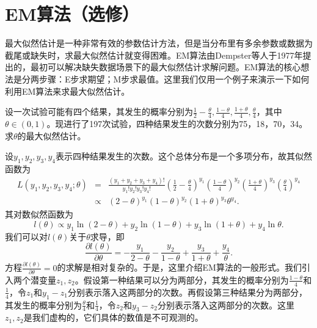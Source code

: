 \section{EM算法（选修）}
最大似然估计是一种非常有效的参数估计方法，但是当分布里有多余参数或数据为截尾或缺失时，求最大似然估计就变得困难。EM算法由Dempster等人于1977年提出的，最初可以解决缺失数据场景下的最大似然估计求解问题。EM算法的核心想法是分两步骤：E步求期望；M步求最值。这里我们仅用一个例子来演示一下如何利用EM算法来求最大似然估计。
\begin{example}
    设一次试验可能有四个结果，其发生的概率分别为$\frac{1}{2}-\frac{\theta}{4}, \frac{1-\theta}{4},\frac{1+\theta}{4},\frac{\theta}{4}$，其中$\theta \in (0,1)$。现进行了197次试验，四种结果发生的次数分别为75，18，70，34。求$\theta$的最大似然估计。
\end{example}
\begin{solution}
设$y_1,y_2,y_3,y_4$表示四种结果发生的次数。这个总体分布是一个多项分布，故其似然函数为
\begin{eqnarray*}
L(y_1,y_2,y_3,y_4;\theta) &=& \frac{(y_1+y_2+y_3+y_4)!}{y_1!y_2!y_3!y_4!} \left(\frac{1}{2}-\frac{\theta}{4}\right)^{y_1} \left(\frac{1-\theta}{4}\right)^{y_{2}}\left(\frac{1+\theta}{4}\right)^{y_{3}}\left(\frac{\theta}{4}\right)^{y_{4}}\\
&\propto& (2-\theta)^{y_1} (1-\theta)^{y_2} (1+\theta)^{y_3} \theta^{y_4}.
\end{eqnarray*}
其对数似然函数为
$$
l(\theta) \propto y_1 \ln(2-\theta) + y_2 \ln (1-\theta) + y_3 \ln(1+\theta) + y_4 \ln \theta.
$$
我们可以对$l(\theta)$关于$\theta$求导，即
$$
\frac{\partial l(\theta)}{\partial \theta} = - \frac{y_1}{2-\theta} - \frac{y_2}{1-\theta} + \frac{y_3}{1+\theta} + \frac{y_4}{\theta}.
$$
方程$\frac{\partial l(\theta)}{\partial \theta} = 0$的求解是相对复杂的。于是，这里介绍EM算法的一般形式。我们引入两个潜变量$z_1,z_2$。假设第一种结果可以分为两部分，其发生的概率分别为$\frac{1-\theta}{4}$和$\frac{1}{4}$，令$z_1$和$y_1-z_1$分别表示落入这两部分的次数。再假设第三种结果分为两部分，其发生的概率分别为$\frac{\theta}{4}$和$\frac{1}{4}$，令$z_2$和$y_3-z_2$分别表示落入这两部分的次数。这里$z_1,z_2$是我们虚构的，它们具体的数值是不可观测的。


\end{solution}
